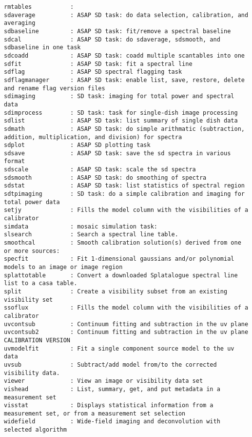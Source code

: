 \begin{verbatim}
rmtables           : 
sdaverage          : ASAP SD task: do data selection, calibration, and averaging
sdbaseline         : ASAP SD task: fit/remove a spectral baseline 
sdcal              : ASAP SD task: do sdaverage, sdsmooth, and sdbaseline in one task
sdcoadd            : ASAP SD task: coadd multiple scantables into one
sdfit              : ASAP SD task: fit a spectral line
sdflag             : ASAP SD spectral flagging task 
sdflagmanager      : ASAP SD task: enable list, save, restore, delete and rename flag version files
sdimaging          : SD task: imaging for total power and spectral data
sdimprocess        : SD task: task for single-dish image processing
sdlist             : ASAP SD task: list summary of single dish data
sdmath             : ASAP SD task: do simple arithmatic (subtraction, addition, multiplication, and division) for spectra
sdplot             : ASAP SD plotting task 
sdsave             : ASAP SD task: save the sd spectra in various format
sdscale            : ASAP SD task: scale the sd spectra
sdsmooth           : ASAP SD task: do smoothing of spectra
sdstat             : ASAP SD task: list statistics of spectral region
sdtpimaging        : SD task: do a simple calibration and imaging for total power data 
setjy              : Fills the model column with the visibilities of a calibrator
simdata            : mosaic simulation task:
slsearch           : Search a spectral line table.
smoothcal          : Smooth calibration solution(s) derived from one or more sources:
specfit            : Fit 1-dimensional gaussians and/or polynomial models to an image or image region
splattotable       : Convert a downloaded Splatalogue spectral line list to a casa table.
split              : Create a visibility subset from an existing visibility set
ssoflux            : Fills the model column with the visibilities of a calibrator
uvcontsub          : Continuum fitting and subtraction in the uv plane
uvcontsub2         : Continuum fitting and subtraction in the uv plane CALIBRATION VERSION
uvmodelfit         : Fit a single component source model to the uv data
uvsub              : Subtract/add model from/to the corrected visibility data.
viewer             : View an image or visibility data set
vishead            : List, summary, get, and put metadata in a measurement set
visstat            : Displays statistical information from a measurement set, or from a measurement set selection
widefield          : Wide-field imaging and deconvolution with selected algorithm
\end{verbatim}
\normalsize

